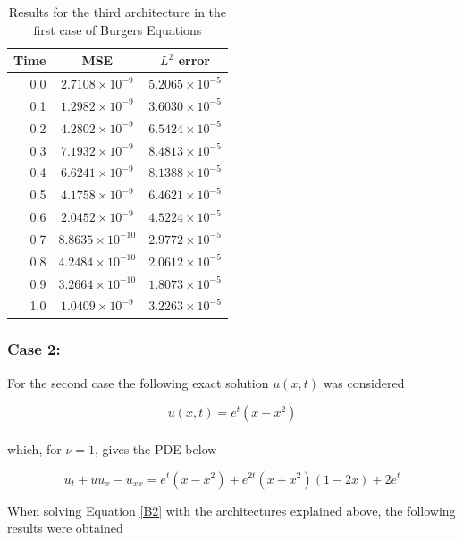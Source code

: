 \documentclass[12pt,letterpaper]{article}
\begin{document}
    \begin{table}[H]
      \begin{center}
      \begin{tabular}{ r | c  c }
      \textbf{Time} & \textbf{MSE} & \textbf{$L^2$ error} \\ \hline
      0.0 & $ 2.7108\times 10^{-9}$ & $ 5.2065\times 10^{-5} $ \\
      0.1 & $ 1.2982\times 10^{-9}$ & $ 3.6030\times 10^{-5} $ \\
      0.2 & $ 4.2802\times 10^{-9}$ & $ 6.5424\times 10^{-5} $ \\
      0.3 & $ 7.1932\times 10^{-9}$ & $ 8.4813\times 10^{-5} $ \\
      0.4 & $ 6.6241\times 10^{-9}$ & $ 8.1388\times 10^{-5} $ \\
      0.5 & $ 4.1758\times 10^{-9}$ & $ 6.4621\times 10^{-5} $ \\
      0.6 & $ 2.0452\times 10^{-9}$ & $ 4.5224\times 10^{-5} $ \\
      0.7 & $ 8.8635\times 10^{-10}$ & $ 2.9772\times 10^{-5} $ \\
      0.8 & $ 4.2484\times 10^{-10}$ & $ 2.0612\times 10^{-5} $ \\
      0.9 & $ 3.2664\times 10^{-10}$ & $ 1.8073\times 10^{-5} $ \\
      1.0 & $ 1.0409\times 10^{-9}$ & $ 3.2263\times 10^{-5} $ \\
      \end{tabular}
      \caption{Results for the third architecture in the first case of Burgers Equations}
      \label{tab:B13}
      \end{center}
      \end{table}  
\subsubsection*{Case 2:}

For the second case the following exact solution $u(x,t)$ was considered

$$u(x,t) = e^{t}(x-x^2)$$\\

which, for $\nu=1$, gives the PDE below

\begin{equation}
  \label{B2}
  u_t + u u_x - u_{xx} = e^t (x-x^2) + e^{2t} (x+x^2) (1-2x) + 2e^t
\end{equation}

When solving Equation \ref{B2} with the architectures explained above, the following results were obtained
\end{document}
